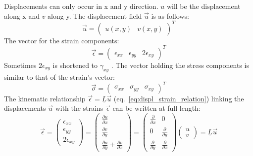   Displacements can only occur in x and y direction. $u$ will be the displacement along x and $v$ along y. The displacement field $\vec{u}$ is as follows:
  \begin{equation}
  \vec{u}=\begin{pmatrix}
  u(x,y) & v(x,y)
  \end{pmatrix}^T
  \end{equation}
  The vector for the strain components:
  \begin{equation}
  \vec{\epsilon}=\begin{pmatrix}
  \epsilon_{xx} & \epsilon_{yy} & 2\epsilon_{xy}
  \end{pmatrix}^T
  \end{equation}
  Sometimes $2\epsilon_{xy}$ is shortened to $\gamma_{xy}$ \cite{steinke2005finite}.
  The vector holding the stress components is similar to that of the strain's vector:
  \begin{equation}
  \vec{\sigma}=\begin{pmatrix}
  \sigma_{xx} & \sigma_{yy} & \sigma_{xy}
  \end{pmatrix}^T
  \end{equation}
  The kinematic relationship $\vec{\epsilon}=\underline{L}\vec{u}$ (eq.\ \ref{eq:displ_strain_relation}) linking the displacements $\vec{u}$ with the strains $\vec{\epsilon}$ can be written at full length:
  \begin{equation}\label{eq:t3displ-str-rel}
  \vec{\epsilon} = \begin{pmatrix}
  \epsilon_{xx} \\
  \epsilon_{yy} \\
  2\epsilon_{xy}
  \end{pmatrix} =
  \begin{pmatrix}
  \frac{\partial u}{\partial x} \\
  \frac{\partial v}{\partial y} \\
  \frac{\partial u}{\partial y} + \frac{\partial v}{\partial x}
  \end{pmatrix} =
  \begin{pmatrix}
  \frac{\partial}{\partial x} & 0 \\
  0 & \frac{\partial}{\partial y} \\
  \frac{\partial}{\partial y} & \frac{\partial}{\partial x}
  \end{pmatrix}
  \begin{pmatrix}
  u \\
  v
  \end{pmatrix}
  = \underline{L} \vec{u}
  \end{equation}
